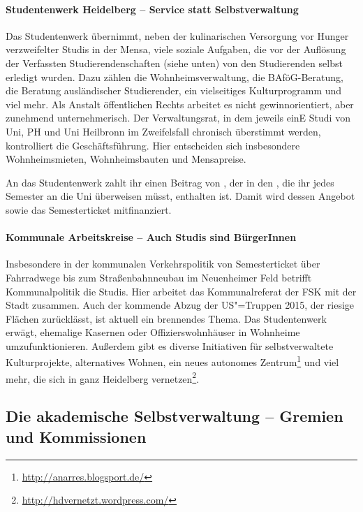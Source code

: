 \paragraph{Studentenwerk Heidelberg -- Service statt Selbstverwaltung}

Das Studentenwerk übernimmt, neben der kulinarischen Versorgung vor Hunger verzweifelter Studis in der Mensa, viele soziale Aufgaben, die vor der Auflösung der Verfassten Studierendenschaften (siehe unten) von den Studierenden selbst erledigt wurden. Dazu zählen die Wohnheimsverwaltung, die BAföG-Beratung, die Beratung ausländischer Studierender, ein vielseitiges Kulturprogramm und viel mehr. Als Anstalt öffentlichen Rechts arbeitet es nicht gewinnorientiert, aber zunehmend unternehmerisch. Der Verwaltungsrat, in dem jeweils einE Studi von Uni, PH und Uni Heilbronn im Zweifelsfall chronisch überstimmt werden, kontrolliert die Geschäftsführung. Hier entscheiden sich insbesondere Wohnheimsmieten, Wohnheimsbauten und Mensapreise.

An das Studentenwerk zahlt ihr einen Beitrag von \EUR{\studentenwerksbeitrag}, der in den \EUR{\beitragssumme}, die ihr jedes Semester an die Uni überweisen müsst, enthalten ist. Damit wird dessen Angebot sowie das Semesterticket mitfinanziert.

\paragraph{Kommunale Arbeitskreise -- Auch Studis sind BürgerInnen}

Insbesondere in der kommunalen Verkehrspolitik von Semesterticket über Fahrradwege bis zum Straßenbahnneubau im Neuenheimer Feld betrifft Kommunalpolitik die Studis. Hier arbeitet das Kommunalreferat der \gls{FSK} mit der Stadt zusammen. Auch der kommende Abzug der US"=Truppen 2015, der riesige Flächen zurücklässt, ist aktuell ein brennendes Thema. Das Studentenwerk erwägt, ehemalige Kasernen oder Offizierswohnhäuser in Wohnheime umzufunktionieren. Außerdem gibt es diverse Initiativen für selbstverwaltete Kulturprojekte, alternatives Wohnen, ein neues autonomes Zentrum\footnote{\url{http://anarres.blogsport.de/}} und viel mehr, die sich in ganz Heidelberg vernetzen\footnote{\url{http://hdvernetzt.wordpress.com/}}.


\subsection{Die akademische Selbstverwaltung -- Gremien und Kommissionen}

